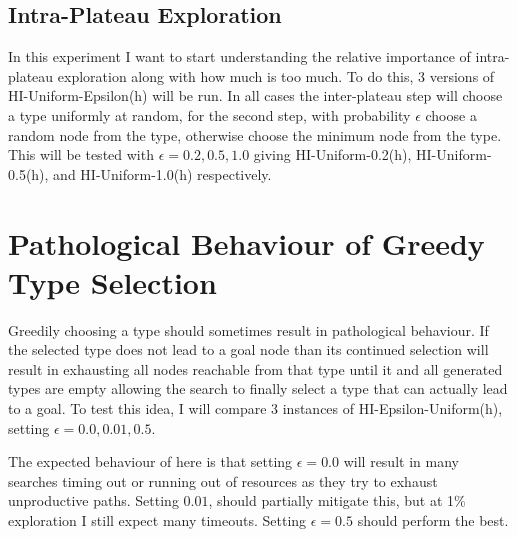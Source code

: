 \documentclass{article}
\theoremstyle{definition}
\begin{document}
\subsection{Intra-Plateau Exploration}
In this experiment I want to start understanding the relative importance of intra-plateau exploration along with how much is too much. To do this, 3 versions of HI-Uniform-Epsilon(h) will be run. In all cases the inter-plateau step will choose a type uniformly at random, for the second step, with probability $\epsilon$ choose a random node from the type, otherwise choose the minimum node from the type. This will be tested with $\epsilon=0.2,0.5,1.0$ giving HI-Uniform-0.2(h), HI-Uniform-0.5(h), and HI-Uniform-1.0(h) respectively.

\section{Pathological Behaviour of Greedy Type Selection}
Greedily choosing a type should sometimes result in pathological behaviour. If the selected type does not lead to a goal node than its continued selection will result in exhausting all nodes reachable from that type until it and all generated types are empty allowing the search to finally select a type that can actually lead to a goal. To test this idea, I will compare 3 instances of HI-Epsilon-Uniform(h), setting $\epsilon=0.0, 0.01, 0.5$.

The expected behaviour of here is that setting $\epsilon=0.0$ will result in many searches timing out or running out of resources as they try to exhaust unproductive paths. Setting $0.01$, should partially mitigate this, but at 1\% exploration I still expect many timeouts. Setting $\epsilon=0.5$ should perform the best.
\end{document}
